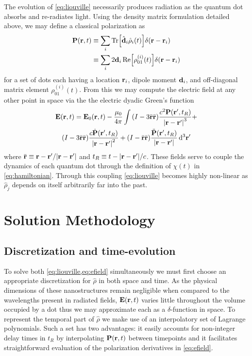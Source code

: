 \documentclass[conference]{IEEEtran}
\begin{document}
The evolution of \cref{eq:liouville} necessarily produces radiation as the quantum dot absorbs and re-radiates light.
Using the density matrix formulation detailed above, we may define a classical polarization as
\begin{equation}
  \begin{aligned}
    \vb{P}(\vb{r}, t) &\equiv \sum_i \Tr[\hat{\vb{d}}_i \hat{\rho}_i(t)] \delta(\vb{r} - \vb{r}_i) \\
                      &\equiv \sum_i 2 \vb{d}_i \Re\!\qty[\rho_{01}^{(i)}(t)] \delta(\vb{r} - \vb{r}_i)
  \end{aligned}
  \label{eq:polarization}
\end{equation}
for a set of dots each having a location $\vb{r}_i$, dipole moment $\vb{d}_i$, and off-diagonal matrix element $\rho_{01}^{(i)}(t)$.
From this we may compute the electric field at any other point in space via the the electric dyadic Green's function\cite{Rothwell2008}
\begin{equation}
  \begin{gathered}
    \vb{E}(\vb{r}, t) = \vb{E}_0(\vb{r}, t) - \frac{\mu_0}{4\pi} \int
      \qty(I - 3\bar{\vb{r}}\bar{\vb{r}}) \frac{c^2 \vb{P}(\vb{r}', t_R)}{\abs{\vb{r} - \vb{r}'}^3} + \\
      \qty(I - 3\bar{\vb{r}}\bar{\vb{r}}) \frac{c \dot{\vb{P}}(\vb{r}', t_R)}{\abs{\vb{r} - \vb{r}'}^2} +
      \qty(I -  \bar{\vb{r}}\bar{\vb{r}}) \frac{\ddot{\vb{P}}(\vb{r}', t_R)}{\abs{\vb{r} - \vb{r}'}} \dd[3]{\vb{r}'}
  \end{gathered}
  \label{eq:efield}
\end{equation}
where $\bar{\vb{r}} \equiv \vb{r} - \vb{r}'/\abs{\vb{r} - \vb{r}'}$ and $t_R \equiv t - \abs{\vb{r} - \vb{r}'}/c$.
These fields serve to couple the dynamics of each quantum dot through the definition of $\chi(t)$ in \cref{eq:hamiltonian}.
Through this coupling \cref{eq:liouville} becomes highly non-linear as $\hat{\rho}_j$ depends on itself arbitrarily far into the past.



\section{Solution Methodology}
\subsection{Discretization and time-evolution}

To solve both \cref{eq:liouville,eq:efield} simultaneously we must first choose an appropriate discretization for $\hat{\rho}$ in both space and time.
As the physical dimensions of these nanostructures remain negligible when compared to the wavelengths present in radiated fields, $\vb{E}(\vb{r}, t)$ varies little throughout the volume occupied by a dot thus we may approximate each as a $\delta$-function in space.
To represent the temporal part of $\hat{\rho}$ we make use of an interpolatory set of Lagrange polynomials.
Such a set has two advantages: it easily accounts for non-integer delay times in $t_R$ by interpolating $\vb{P}(\vb{r}, t)$ between timepoints and it facilitates straightforward evaluation of the polarization derivatives in \cref{eq:efield}.
\end{document}
